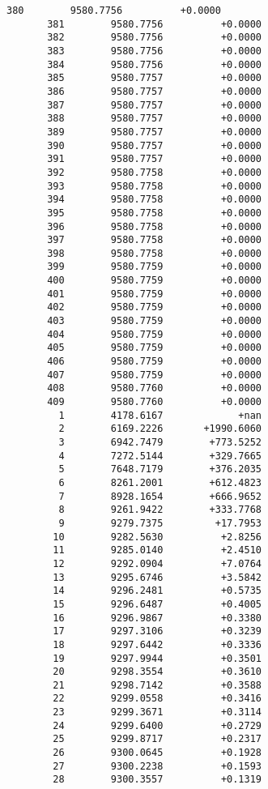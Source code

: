 \documentclass[11pt]{article}
\begin{document}
\begin{Verbatim}[commandchars=\\\{\}]
       380        9580.7756          +0.0000
       381        9580.7756          +0.0000
       382        9580.7756          +0.0000
       383        9580.7756          +0.0000
       384        9580.7756          +0.0000
       385        9580.7757          +0.0000
       386        9580.7757          +0.0000
       387        9580.7757          +0.0000
       388        9580.7757          +0.0000
       389        9580.7757          +0.0000
       390        9580.7757          +0.0000
       391        9580.7757          +0.0000
       392        9580.7758          +0.0000
       393        9580.7758          +0.0000
       394        9580.7758          +0.0000
       395        9580.7758          +0.0000
       396        9580.7758          +0.0000
       397        9580.7758          +0.0000
       398        9580.7758          +0.0000
       399        9580.7759          +0.0000
       400        9580.7759          +0.0000
       401        9580.7759          +0.0000
       402        9580.7759          +0.0000
       403        9580.7759          +0.0000
       404        9580.7759          +0.0000
       405        9580.7759          +0.0000
       406        9580.7759          +0.0000
       407        9580.7759          +0.0000
       408        9580.7760          +0.0000
       409        9580.7760          +0.0000
         1        4178.6167             +nan
         2        6169.2226       +1990.6060
         3        6942.7479        +773.5252
         4        7272.5144        +329.7665
         5        7648.7179        +376.2035
         6        8261.2001        +612.4823
         7        8928.1654        +666.9652
         8        9261.9422        +333.7768
         9        9279.7375         +17.7953
        10        9282.5630          +2.8256
        11        9285.0140          +2.4510
        12        9292.0904          +7.0764
        13        9295.6746          +3.5842
        14        9296.2481          +0.5735
        15        9296.6487          +0.4005
        16        9296.9867          +0.3380
        17        9297.3106          +0.3239
        18        9297.6442          +0.3336
        19        9297.9944          +0.3501
        20        9298.3554          +0.3610
        21        9298.7142          +0.3588
        22        9299.0558          +0.3416
        23        9299.3671          +0.3114
        24        9299.6400          +0.2729
        25        9299.8717          +0.2317
        26        9300.0645          +0.1928
        27        9300.2238          +0.1593
        28        9300.3557          +0.1319

\end{Verbatim}
\end{document}
